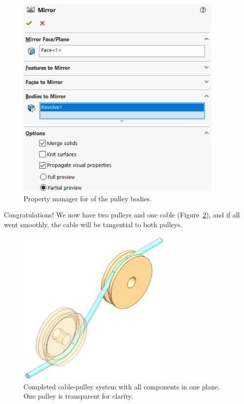 \begin{figure}[H]
\begin{center}
  \includegraphics[height=4in]{images/figures/mirror-dialog.png}
\end{center}
\caption{Property manager for  of the pulley bodies. \label{fig:mirror-dialog}}

\end{figure}

Congratulations! We now have two pulleys and one cable
(Figure~\ref{fig:completed-planar2}), and if all went
smoothly, the cable will be tangential to both pulleys.

\begin{figure}[H]
\begin{center}
  \includegraphics[width=3in]{images/figures/completed-planar.png}
\end{center}
\caption{Completed cable-pulley system with all components in one plane. One pulley is
transparent for clarity.
\label{fig:completed-planar2}}

\end{figure}


